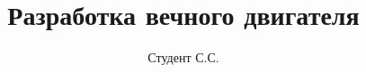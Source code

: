 \documentclass[12pt,a4paper,oneside,final]{report}
\author{Студент С.С.}
\title{Разработка вечного двигателя}
\newcommand{\pwd}{templates/uir}
\begin{document}
    \maketitle
    \setcounter{page}{2}
    \clearpage
    
    \clearpage
    \tableofcontents{}
    \clearpage
    
    \clearpage
    
    \clearpage
    
    \clearpage
    
    \clearpage
    
    \clearpage
    
    \clearpage
    
    \clearpage
    \appendixtocon
    \appendix
    \renewcommand\thechapter{\Asbuk{chapter}}
    
\end{document}
